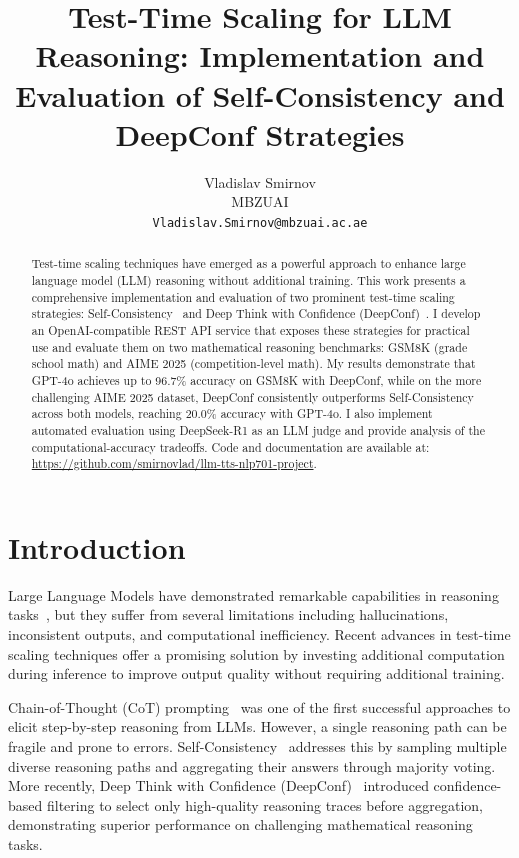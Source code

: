 \documentclass[11pt]{article}
\title{Test-Time Scaling for LLM Reasoning: Implementation and Evaluation of Self-Consistency and DeepConf Strategies}
\author{Vladislav Smirnov \\
  MBZUAI \\
  \texttt{Vladislav.Smirnov@mbzuai.ac.ae} \\
}
\begin{document}
\maketitle

\begin{abstract}
Test-time scaling techniques have emerged as a powerful approach to enhance large language model (LLM) reasoning without additional training. This work presents a comprehensive implementation and evaluation of two prominent test-time scaling strategies: Self-Consistency~\cite{wang2022self} and Deep Think with Confidence (DeepConf)~\cite{sun2024deep}. I develop an OpenAI-compatible REST API service that exposes these strategies for practical use and evaluate them on two mathematical reasoning benchmarks: GSM8K (grade school math) and AIME 2025 (competition-level math). My results demonstrate that GPT-4o achieves up to 96.7\% accuracy on GSM8K with DeepConf, while on the more challenging AIME 2025 dataset, DeepConf consistently outperforms Self-Consistency across both models, reaching 20.0\% accuracy with GPT-4o. I also implement automated evaluation using DeepSeek-R1 as an LLM judge and provide analysis of the computational-accuracy tradeoffs. Code and documentation are available at: \url{https://github.com/smirnovlad/llm-tts-nlp701-project}.
\end{abstract}

\section{Introduction}

Large Language Models have demonstrated remarkable capabilities in reasoning tasks~\cite{brown2020language,bubeck2023sparks}, but they suffer from several limitations including hallucinations, inconsistent outputs, and computational inefficiency. Recent advances in test-time scaling techniques offer a promising solution by investing additional computation during inference to improve output quality without requiring additional training.

Chain-of-Thought (CoT) prompting~\cite{wei2022chain} was one of the first successful approaches to elicit step-by-step reasoning from LLMs. However, a single reasoning path can be fragile and prone to errors. Self-Consistency~\cite{wang2022self} addresses this by sampling multiple diverse reasoning paths and aggregating their answers through majority voting. More recently, Deep Think with Confidence (DeepConf)~\cite{sun2024deep} introduced confidence-based filtering to select only high-quality reasoning traces before aggregation, demonstrating superior performance on challenging mathematical reasoning tasks.
\end{document}
